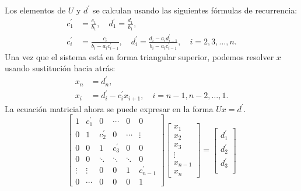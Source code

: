 \begin{frame}
	\frametitle{\insertsection}
	Los elementos de $U$ y $d^{\prime}$ se calculan usando las
	siguientes fórmulas de recurrencia:
	\begin{align*}
		c^{\prime}_{1} & =
		\frac{c_{1}}{b_{1}},\quad
		d^{\prime}_{1}=
		\frac{d_{1}}{b_{1}}, \\
		c^{\prime}_{i} & =
		\frac{c_{i}}{b_{i}-a_{i}c^{\prime}_{i-1}},\quad
		d^{\prime}_{i}=
		\frac{d_{i}-a_{i}d^{\prime}_{i-1}}{b_{i}-a_{i}c^{\prime}_{i-1}},\quad
		i=2,3,\dotsc,n.
	\end{align*}
	Una vez que el sistema está en forma triangular superior, podemos
	resolver $x$ usando sustitución hacia atrás:
	\begin{align*}
		x_{n} & =
		d^{\prime}_{n}, \\
		x_{i} & =
		d^{\prime}_{i}-
		c^{\prime}_{i}x_{i+1},\quad i=n-1,n-2,\dotsc,1.
	\end{align*}
	La ecuación matricial ahora se puede expresar en la forma
	$Ux=d^{\prime}$.
	\begin{equation}\label{eq:upperdiagonal}
		\begin{bmatrix}
			1      & c^{\prime}_{1} & 0              & \cdots         & 0      & 0                \\
			0      & 1              & c^{\prime}_{2} & 0              & \cdots & \vdots           \\
			0      & 0              & 1              & c^{\prime}_{3} & 0      & 0                \\
			0      & 0              & \ddots         & \ddots         & \ddots & 0                \\
			\vdots & \vdots         & 0              & 0              & 1      & c^{\prime}_{n-1} \\
			0      & \cdots         & 0              & 0              & 0      & 1
		\end{bmatrix}
		\begin{bmatrix}
			x_{1}   \\
			x_{2}   \\
			x_{3}   \\
			\vdots  \\
			x_{n-1} \\
			x_{n}
		\end{bmatrix}=
		\begin{bmatrix}
			d^{\prime}_{1}   \\
			d^{\prime}_{2}   \\
			d^{\prime}_{3}   \\

\end{bmatrix}
\end{equation}
\end{frame}
